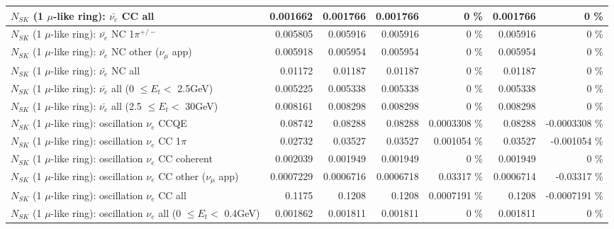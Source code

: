 \begin{table}
\begin{tabular}{| l | r | r | r  r | r  r |}
                            $N_{SK}$ (1 $\mu$-like ring): $\bar{\nu_{e}}$ CC all &        0.001662 &        0.001766 &        0.001766 &        0 \%  &        0.001766 &        0 \%  \\ 
\hline
                     $N_{SK}$ (1 $\mu$-like ring): $\bar{\nu_e}$ NC 1$\pi^{+/-}$ &        0.005805 &        0.005916 &        0.005916 &        0 \%  &        0.005916 &        0 \%  \\ 
            $N_{SK}$ (1 $\mu$-like ring): $\bar{\nu_e}$ NC other ($\nu_\mu$ app) &        0.005918 &        0.005954 &        0.005954 &        0 \%  &        0.005954 &        0 \%  \\ 
                            $N_{SK}$ (1 $\mu$-like ring): $\bar{\nu_{e}}$ NC all &         0.01172 &         0.01187 &         0.01187 &        0 \%  &         0.01187 &        0 \%  \\ 
\hline
     $N_{SK}$ (1 $\mu$-like ring): $\bar{\nu_{e}}$ all (0 $\leq E_{t} <$ 2.5GeV) &        0.005225 &        0.005338 &        0.005338 &        0 \%  &        0.005338 &        0 \%  \\ 
    $N_{SK}$ (1 $\mu$-like ring): $\bar{\nu_{e}}$ all (2.5 $\leq E_{t} <$ 30GeV) &        0.008161 &        0.008298 &        0.008298 &        0 \%  &        0.008298 &        0 \%  \\ 
\hline
\hline
\hline
                          $N_{SK}$ (1 $\mu$-like ring): oscillation $\nu_e$ CCQE &         0.08742 &         0.08288 &         0.08288 & 0.0003308 \%  &         0.08288 & -0.0003308 \%  \\ 
                     $N_{SK}$ (1 $\mu$-like ring): oscillation $\nu_e$ CC 1$\pi$ &         0.02732 &         0.03527 &         0.03527 & 0.001054 \%  &         0.03527 & -0.001054 \%  \\ 
                   $N_{SK}$ (1 $\mu$-like ring): oscillation $\nu_e$ CC coherent &        0.002039 &        0.001949 &        0.001949 &        0 \%  &        0.001949 &        0 \%  \\ 
      $N_{SK}$ (1 $\mu$-like ring): oscillation $\nu_e$ CC other ($\nu_\mu$ app) &       0.0007229 &       0.0006716 &       0.0006718 &  0.03317 \%  &       0.0006714 & -0.03317 \%  \\ 
                       $N_{SK}$ (1 $\mu$-like ring): oscillation $\nu_e$  CC all &          0.1175 &          0.1208 &          0.1208 & 0.0007191 \%  &          0.1208 & -0.0007191 \%  \\ 
\hline
$N_{SK}$ (1 $\mu$-like ring): oscillation $\nu_{e}$ all (0 $\leq E_{t} <$ 0.4GeV) &        0.001862 &        0.001811 &        0.001811 &        0 \%  &        0.001811 &        0 \%  \\ 

\end{tabular}
\end{table}
